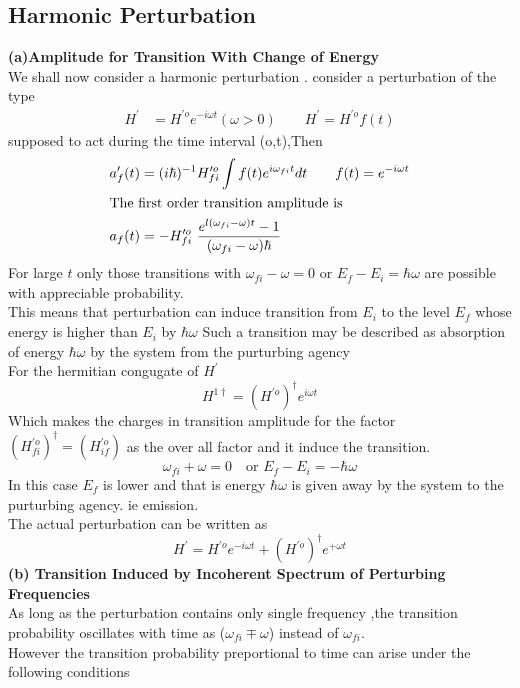 \subsection{Harmonic Perturbation}
\textbf{(a)Amplitude for Transition With Change of Energy}\\
We shall now consider a harmonic perturbation .
consider a perturbation of the type
\begin{align*}
H^\prime&=H^{\prime o}e^{-i\omega t} (\omega>0) \quad \quad  H^\prime=H^{\prime o}f(t)
\end{align*}
supposed to act during the time interval (o,t),Then
\begin{align*}
a^{\prime}_f (t)&=(i\hbar)^{-1}H^{\prime o}_{fi}\int f(t)e^{i\omega_{fi} t}  dt \quad \quad  f(t)=e^{-i\omega t}\\
\intertext{The first order transition amplitude is}
a_f(t)& =-H^{\prime o}_{fi}\ \frac{e^{l(\omega_{fi}-\omega)t}-1}{(\omega_{fi}-\omega)\hbar}
\end{align*}
For large $t$ only those transitions with $\omega_{fi}-\omega=0$ or $E_f-E_i=\hbar \omega$  are possible with appreciable probability.\\
This means that perturbation can induce transition from $E_i$ to the level $E_f$ whose energy is higher than $E_i$ by $\hbar \omega$
Such a transition may be described as absorption of energy $\hbar \omega$ by the system from the purturbing agency\\
For the hermitian congugate of $H^\prime$\\
$$ H^{1\dagger}=(H^{\prime o})^\dagger e^{i\omega t}$$
Which makes the charges in transition amplitude for the factor $(H^{\prime o}_{fi})^\dagger=(H^{\prime o}_{if})$ as the over all factor and it induce the transition.
$$\omega_{fi}+\omega=0\quad \text{or }E_f-E_i=-\hbar\omega $$
In this case $E_f$ is lower and that is energy $\hbar\omega$ is given away by the system to the purturbing agency. ie emission.\\
The actual perturbation can be written as 
$$ H^\prime=H^{\prime o}e^{-i \omega t}+(H^{\prime o})^\dagger e^{+\omega t}$$
\textbf{(b) Transition Induced by Incoherent Spectrum of Perturbing Frequencies}\\
As long as the perturbation contains only single frequency ,the transition probability oscillates with time as ($\omega_{fi}\mp\omega$) instead of $\omega_{fi}$.\\
However the transition probability preportional to time can arise under the following conditions\\
